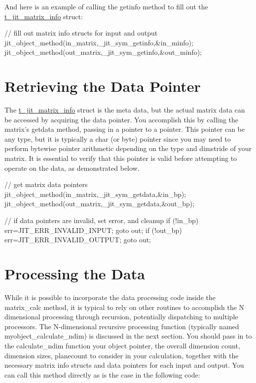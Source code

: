 And here is an example of calling the getinfo method to fill out the \hyperlink{structt__jit__matrix__info}{t\_\-jit\_\-matrix\_\-info} struct: 
\begin{DoxyCode}
   // fill out matrix info structs for input and output      
   jit_object_method(in_matrix,_jit_sym_getinfo,&in_minfo);
   jit_object_method(out_matrix,_jit_sym_getinfo,&out_minfo);
\end{DoxyCode}
\hypertarget{chapter_jit_mopdetails_chapter_jit_mopdetails_data}{}\section{Retrieving the Data Pointer}\label{chapter_jit_mopdetails_chapter_jit_mopdetails_data}
The \hyperlink{structt__jit__matrix__info}{t\_\-jit\_\-matrix\_\-info} struct is the meta data, but the actual matrix data can be accessed by acquiring the data pointer. You accomplish this by calling the matrix's getdata method, passing in a pointer to a pointer. This pointer can be any type, but it is typically a char (or byte) pointer since you may need to perform bytewise pointer arithmetic depending on the type and dimstride of your matrix. It is essential to verify that this pointer is valid before attempting to operate on the data, as demonstrated below.


\begin{DoxyCode}
   // get matrix data pointers
   jit_object_method(in_matrix,_jit_sym_getdata,&in_bp);
   jit_object_method(out_matrix,_jit_sym_getdata,&out_bp);
   
   // if data pointers are invalid, set error, and cleanup
   if (!in_bp) { err=JIT_ERR_INVALID_INPUT; goto out;}
   if (!out_bp) { err=JIT_ERR_INVALID_OUTPUT; goto out;}
\end{DoxyCode}
\hypertarget{chapter_jit_mopdetails_chapter_jit_mopdetails_dataproc}{}\section{Processing the Data}\label{chapter_jit_mopdetails_chapter_jit_mopdetails_dataproc}
While it is possible to incorporate the data processing code inside the matrix\_\-calc method, it is typical to rely on other routines to accomplish the N dimensional processing through recursion, potentially dispatching to multiple processors. The N-\/dimensional recursive processing function (typically named myobject\_\-calculate\_\-ndim) is discussed in the next section. You should pass in to the calculate\_\-ndim function your object pointer, the overall dimension count, dimension sizes, planecount to consider in your calculation, together with the necessary matrix info structs and data pointers for each input and output. You can call this method directly as is the case in the following code:


